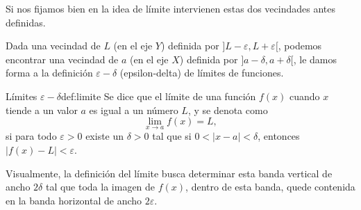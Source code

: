 Si nos fijamos bien en la idea de límite intervienen estas dos vecindades antes definidas.

Dada una vecindad de $L$ (en el eje $Y$) definida por $] L-\varepsilon,L+\varepsilon [$, podemos encontrar una vecindad de $a$ (en el eje $X$) definida por $] a-\delta,a+\delta [$, le damos forma a la definición $\varepsilon - \delta$ (epsilon-delta) de límites de funciones.

\begin{definition}{Límites $\varepsilon - \delta$}{def:limite}
    Se dice que el límite de una función $f(x)$ cuando $x$ tiende a un valor $a$ es igual a un número $L$, y se denota como
    \[
        \lim_{x \to a} f(x) = L,
    \]
    si para todo $\varepsilon > 0$ existe un $\delta > 0$ tal que si $0 < |x - a| < \delta$, entonces $|f(x) - L| < \varepsilon$.
\end{definition}

Visualmente, la definición del límite busca determinar esta banda vertical de ancho $2 \delta$ tal que toda la imagen de $f(x)$, dentro de esta banda, quede contenida en la banda horizontal de ancho $2 \varepsilon$.

